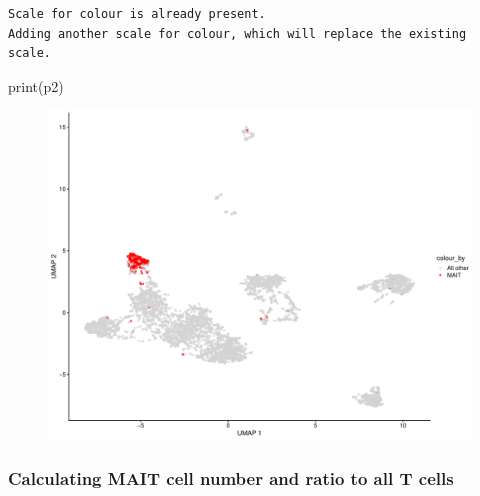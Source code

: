 \documentclass[
  letterpaper,
  DIV=11,
  numbers=noendperiod]{scrartcl}
\newenvironment{Shaded}{\begin{snugshade}}{\end{snugshade}}
\newcommand{\DecValTok}[1]{\textcolor[rgb]{0.68,0.00,0.00}{#1}}
\newcommand{\FunctionTok}[1]{\textcolor[rgb]{0.28,0.35,0.67}{#1}}
\newcommand{\NormalTok}[1]{\textcolor[rgb]{0.00,0.23,0.31}{#1}}
\newcommand{\OtherTok}[1]{\textcolor[rgb]{0.00,0.23,0.31}{#1}}
\newcommand{\SpecialCharTok}[1]{\textcolor[rgb]{0.37,0.37,0.37}{#1}}
\newcommand{\StringTok}[1]{\textcolor[rgb]{0.13,0.47,0.30}{#1}}
\begin{document}
\begin{verbatim}
Scale for colour is already present.
Adding another scale for colour, which will replace the existing scale.
\end{verbatim}

\begin{Shaded}
\begin{Highlighting}[]
\FunctionTok{print}\NormalTok{(p2)}
\end{Highlighting}
\end{Shaded}

\begin{figure}[H]

{\centering \includegraphics{2-Lett-data-SingleR_pdf_files/figure-pdf/unnamed-chunk-20-1.pdf}

}

\end{figure}

\hypertarget{calculating-mait-cell-number-and-ratio-to-all-t-cells}{%
\subsubsection{Calculating MAIT cell number and ratio to all T
cells}\label{calculating-mait-cell-number-and-ratio-to-all-t-cells}}

\begin{Shaded}
\end{Shaded}
\end{document}
